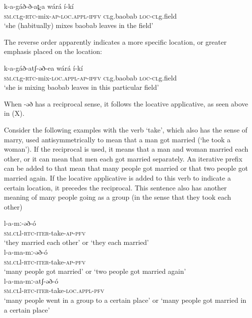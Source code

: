 \ea
\gll k-a-gáð-ð-at̪-a 				wárá 		í-kí	\\
\textsc{sm.cl}g-\textsc{rtc}-mix-\textsc{ap-loc.appl-\textsc{ipfv}}	\textsc{cl}g.baobab	\textsc{loc-cl}g.field\\
\trans ‘she (habitually) mixes baobab leaves in the field’\\
\z

The reverse order apparently indicates a more specific location, or greater emphasis placed on the location:

\ea
\gll k-a-gáð-atʃ-əð-ea 				wárá 		í-kí	\\
\textsc{sm.cl}g-\textsc{rtc}-mix-\textsc{loc.appl-ap-\textsc{ipfv}}		\textsc{cl}g.baobab	\textsc{loc-cl}g.field\\
\trans ‘she is mixing baobab leaves in this particular field’\\
\z

When -əð has a reciprocal sense, it follows the locative applicative, as seen above in (X).

Consider the following examples with the verb ‘take’, which also has the sense of marry, used antisymmetrically to mean that a man got married (‘he took a woman’). If the reciprocal is used, it means that a man and woman married each other, or it can mean that men each got married separately. An iterative prefix can be added to that mean that many people got married or that two people got married again. If the locative applicative is added to this verb to indicate a certain location, it precedes the reciprocal. This sentence also has another meaning of many people going as a group (in the sense that they took each other)

\ea
\ea \gll	l-a-mː-əð-ó\\
		\textsc{sm.cl}l-\textsc{rtc}-\textsc{iter}-take-\textsc{ap-\textsc{pfv}}\\
		\trans ‘they married each other’ or ‘they each married’\\

\ex \gll 	l-a-ma-mː-əð-ó 	\\
		\textsc{sm.cl}l-\textsc{rtc}-\textsc{iter}-take-\textsc{ap-\textsc{pfv}}\\
 		\trans ‘many people got married’ or ‘two people got married again’\\

\ex \gll	l-a-ma-mː-atʃ-əð-ó 	\\
		\textsc{sm.cl}l-\textsc{rtc}-\textsc{iter}-take-\textsc{loc.appl-\textsc{pfv}}\\
 		\trans ‘many people went in a group to a certain place’ or \hspace{3cm} ‘many people got married in a certain place’\\
\z
\z

